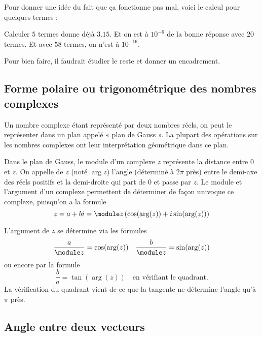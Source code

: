 Pour donner une idée du fait que ça fonctionne pas mal, voici le calcul pour quelques termes :

Calculer \( 5\) termes donne déjà \( 3.15\). Et on est à \( 10^{-6}\) de la bonne réponse avec \( 20\) termes. Et avec $58$ termes, on n'est à \( 10^{-16}\).

\begin{probleme}
	Pour bien faire, il faudrait étudier le reste et donner un encadrement.
\end{probleme}

\subsection[Forme trigonométrique des nombres complexes]{Forme polaire ou trigonométrique des nombres complexes}

Un nombre complexe étant représenté par deux nombres réels, on peut le représenter dans un plan appelé « plan de Gauss ». La plupart des opérations sur les nombres complexes ont leur interprétation géométrique dans ce plan.

Dans le plan de Gauss, le module d'un complexe $z$ représente la distance entre $0$ et $z$. On appelle  de $z$ (noté $\arg z$) l'angle (déterminé à $2\pi$ près) entre le demi-axe des réels positifs et la demi-droite qui part de $0$ et passe par $z$. Le module et l'argument d'un complexe permettent de déterminer de façon univoque ce complexe, puisqu'on a la formule
\[z = a + bi = \module z \left( \cos(\arg(z)) + i \sin(\arg(z)) \right)\]

L'argument de $z$ se détermine via les formules
\[\frac a {\module z} = \cos(\arg(z)) \quad \frac b {\module z} = \sin(\arg(z))\]
ou encore par la formule
\[
	\frac b a = \tan(\arg(z)) \quad \text{en vérifiant le quadrant.}
\]
La vérification du quadrant vient de ce que la tangente ne détermine l'angle qu'à $\pi$ près.

\subsection{Angle entre deux vecteurs}

